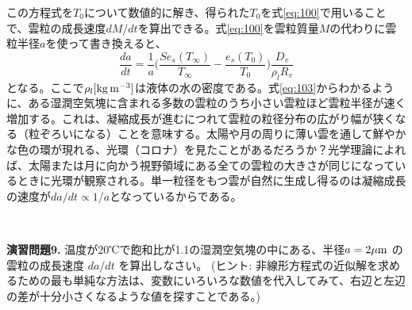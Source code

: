 \documentclass{ltjsarticle}
\begin{document}
この方程式を$T_{0}$について数値的に解き、得られた$T_{0}$を式\eqref{eq:100}で用いることで、雲粒の成長速度$dM/dt$を算出できる。式\eqref{eq:100}を雲粒質量$M$の代わりに雲粒半径$a$を使って書き換えると、
\begin{equation}\label{eq:103}
\frac{da}{dt} = \frac{1}{a}{\bigg (} \frac{S e_{s}(T_{\infty})}{T_{\infty}}-\frac{e_{s}(T_{0})}{T_{0}} {\bigg )}\frac{D_{v}}{\rho_{l} R_{v}}
\end{equation}
となる。ここで$\rho_{l} \rm[kg\, m^{-3}]$は液体の水の密度である。式\eqref{eq:103}からわかるように、ある湿潤空気塊に含まれる多数の雲粒のうち小さい雲粒ほど雲粒半径が速く増加する。これは、凝縮成長が進むにつれて雲粒の粒径分布の広がり幅が狭くなる（粒ぞろいになる）ことを意味する。太陽や月の周りに薄い雲を通して鮮やかな色の環が現れる、光環（コロナ）を見たことがあるだろうか？光学理論によれば、太陽または月に向かう視野領域にある全ての雲粒の大きさが同じになっているときに光環が観察される。単一粒径をもつ雲が自然に生成し得るのは凝縮成長の速度が$da/dt \propto 1/a$となっているからである。

\leavevmode \\
\begin{itembox}[l]{\bf{演習問題9.}}
温度が20℃で飽和比が1.1の湿潤空気塊の中にある、半径$a=2 \rm \mu m$ の雲粒の成長速度 $da/dt$ を算出しなさい。 (ヒント: 非線形方程式の近似解を求めるための最も単純な方法は、変数にいろいろな数値を代入してみて、右辺と左辺の差が十分小さくなるような値を探すことである。)
\end{itembox}
\end{document}
